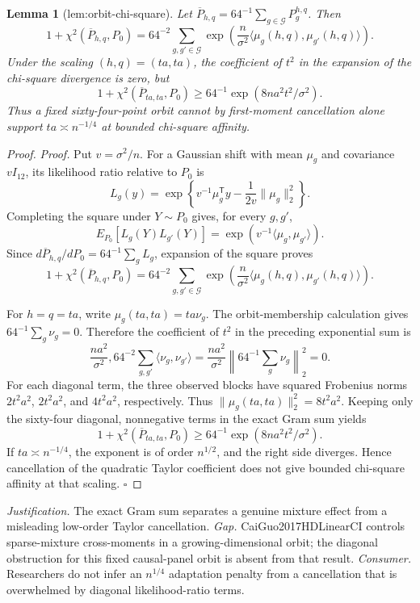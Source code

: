 \documentclass{article}
\newtheorem{lemma}{Lemma}
\begin{document}
\begin{lemma}[lem:orbit-chi-square]\label{lem:orbit-chi-square}
Let \(\overline P_{h,q}=64^{-1}\sum_{g\in\mathcal G}P_g^{h,q}\). Then \[1+\chi^2(\overline P_{h,q},P_0)=64^{-2}\sum_{g,g'\in\mathcal G}\exp\!\left(\frac{n}{\sigma^2}\langle\mu_g(h,q),\mu_{g'}(h,q)\rangle\right).\] Under the scaling \((h,q)=(ta,ta)\), the coefficient of \(t^2\) in the expansion of the chi-square divergence is zero, but \[1+\chi^2(\overline P_{ta,ta},P_0)\ge64^{-1}\exp(8na^2t^2/\sigma^2).\] Thus a fixed sixty-four-point orbit cannot by first-moment cancellation alone support \(ta\asymp n^{-1/4}\) at bounded chi-square affinity.
\end{lemma}
\begin{proof}
\textit{Proof.}
Put \(v=\sigma^2/n\).  For a Gaussian shift with mean \(\mu_g\) and covariance
\(vI_{12}\), its likelihood ratio relative to \(P_0\) is
\[
L_g(y)=\exp\!\left\{v^{-1}\mu_g^{\mathsf T}y
-\frac{1}{2v}\lVert\mu_g\rVert_2^2\right\}.
\]
Completing the square under \(Y\sim P_0\) gives, for every \(g,g'\),
\[
E_{P_0}[L_g(Y)L_{g'}(Y)]
=\exp\!\left(v^{-1}\langle\mu_g,\mu_{g'}\rangle\right).
\]
Since \(d\overline P_{h,q}/dP_0=64^{-1}\sum_gL_g\), expansion of the square
proves
\[
1+\chi^2(\overline P_{h,q},P_0)
=64^{-2}\sum_{g,g'\in\mathcal G}
\exp\!\left(\frac n{\sigma^2}
\langle\mu_g(h,q),\mu_{g'}(h,q)\rangle\right).
\]

For \(h=q=ta\), write \(\mu_g(ta,ta)=ta\nu_g\).  The orbit-membership
calculation gives \(64^{-1}\sum_g\nu_g=0\).  Therefore the coefficient of
\(t^2\) in the preceding exponential sum is
\[
\frac{na^2}{\sigma^2},64^{-2}
\sum_{g,g'}\langle\nu_g,\nu_{g'}\rangle
=\frac{na^2}{\sigma^2}
\left\lVert64^{-1}\sum_g\nu_g\right\rVert_2^2=0.
\]
For each diagonal term, the three observed blocks have squared Frobenius norms
\(2t^2a^2\), \(2t^2a^2\), and \(4t^2a^2\), respectively.  Thus
\(\lVert\mu_g(ta,ta)\rVert_2^2=8t^2a^2\).  Keeping only the sixty-four
diagonal, nonnegative terms in the exact Gram sum yields
\[
1+\chi^2(\overline P_{ta,ta},P_0)
\geq64^{-1}\exp(8na^2t^2/\sigma^2).
\]
If \(ta\asymp n^{-1/4}\), the exponent is of order \(n^{1/2}\), and the
right side diverges.  Hence cancellation of the quadratic Taylor coefficient
does not give bounded chi-square affinity at that scaling. \(\square\)
\end{proof}
\par\smallskip\noindent \textit{Justification.} The exact Gram sum separates a genuine mixture effect from a misleading low-order Taylor cancellation. \textit{Gap.} CaiGuo2017HDLinearCI controls sparse-mixture cross-moments in a growing-dimensional orbit; the diagonal obstruction for this fixed causal-panel orbit is absent from that result. \textit{Consumer.} Researchers do not infer an \(n^{1/4}\) adaptation penalty from a cancellation that is overwhelmed by diagonal likelihood-ratio terms.
\end{document}
